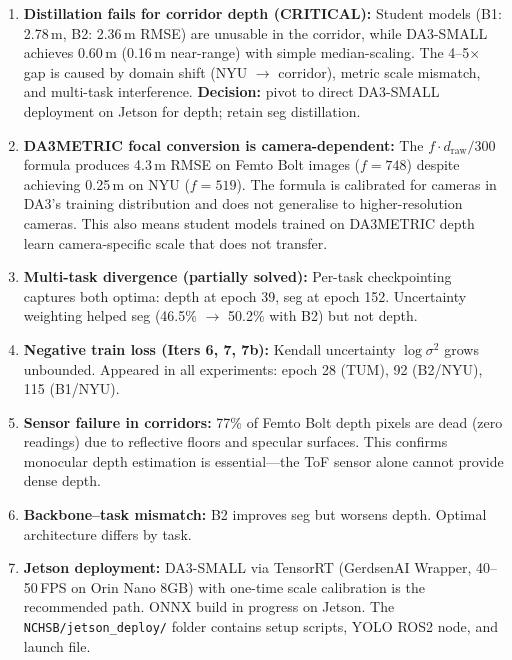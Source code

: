 \documentclass[11pt,a4paper]{article}
\begin{document}
\begin{enumerate}
  \item \textbf{Distillation fails for corridor depth (CRITICAL):}
    Student models (B1: 2.78\,m, B2: 2.36\,m RMSE) are unusable in
    the corridor, while DA3-SMALL achieves 0.60\,m (0.16\,m near-range)
    with simple median-scaling. The 4--5$\times$ gap is caused by
    domain shift (NYU $\to$ corridor), metric scale mismatch, and
    multi-task interference. \textbf{Decision:} pivot to direct
    DA3-SMALL deployment on Jetson for depth; retain seg distillation.

  \item \textbf{DA3METRIC focal conversion is camera-dependent:}
    The $f \cdot d_{\text{raw}} / 300$ formula produces 4.3\,m RMSE
    on Femto Bolt images ($f = 748$) despite achieving 0.25\,m on NYU
    ($f = 519$). The formula is calibrated for cameras in DA3's training
    distribution and does not generalise to higher-resolution cameras.
    This also means student models trained on DA3METRIC depth learn
    camera-specific scale that does not transfer.

  \item \textbf{Multi-task divergence (partially solved):} Per-task
    checkpointing captures both optima: depth at epoch 39, seg at epoch
    152. Uncertainty weighting helped seg (46.5\% $\to$ 50.2\% with B2)
    but not depth.

  \item \textbf{Negative train loss (Iters 6, 7, 7b):} Kendall
    uncertainty $\log \sigma^2$ grows unbounded. Appeared in all
    experiments: epoch 28 (TUM), 92 (B2/NYU), 115 (B1/NYU).

  \item \textbf{Sensor failure in corridors:} 77\% of Femto Bolt
    depth pixels are dead (zero readings) due to reflective floors and
    specular surfaces. This confirms monocular depth estimation is
    essential---the ToF sensor alone cannot provide dense depth.

  \item \textbf{Backbone--task mismatch:} B2 improves seg but worsens
    depth. Optimal architecture differs by task.

  \item \textbf{Jetson deployment:} DA3-SMALL via TensorRT
    (GerdsenAI Wrapper, 40--50\,FPS on Orin Nano 8GB) with one-time
    scale calibration is the recommended path. ONNX build in progress
    on Jetson. The \texttt{NCHSB/jetson\_deploy/} folder contains
    setup scripts, YOLO ROS2 node, and launch file.
\end{enumerate}
\end{document}
